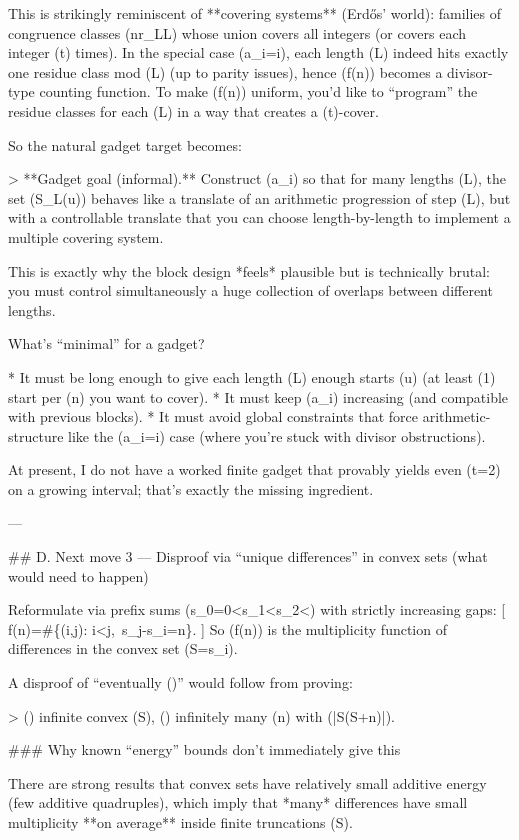 This is strikingly reminiscent of **covering systems** (Erdős’ world): families of congruence classes ({n\equiv r_L\pmod L}) whose union covers all integers (or covers each integer (t) times). In the special case (a_i=i), each length (L) indeed hits exactly one residue class mod (L) (up to parity issues), hence (f(n)) becomes a divisor-type counting function. To make (f(n)) uniform, you’d like to “program” the residue classes for each (L) in a way that creates a (t)-cover.

So the natural gadget target becomes:

> **Gadget goal (informal).** Construct (a_i) so that for many lengths (L), the set ({S_L(u)}) behaves like a translate of an arithmetic progression of step (L), but with a controllable translate that you can choose length-by-length to implement a multiple covering system.

This is exactly why the block design *feels* plausible but is technically brutal: you must control simultaneously a huge collection of overlaps between different lengths.

What’s “minimal” for a gadget?

* It must be long enough to give each length (L) enough starts (u) (at least (1) start per (n) you want to cover).
* It must keep (a_i) increasing (and compatible with previous blocks).
* It must avoid global constraints that force arithmetic-structure like the (a_i=i) case (where you’re stuck with divisor obstructions).

At present, I do not have a worked finite gadget that provably yields even (t=2) on a growing interval; that’s exactly the missing ingredient.

---

## D. Next move 3 — Disproof via “unique differences” in convex sets (what would need to happen)

Reformulate via prefix sums (s_0=0<s_1<s_2<\cdots) with strictly increasing gaps:
[
f(n)=\#\{(i,j): i<j,\ s_j-s_i=n\}.
]
So (f(n)) is the multiplicity function of differences in the convex set (S={s_i}).

A disproof of “eventually ()” would follow from proving:

> (\forall) infinite convex (S), (\exists) infinitely many (n) with (|S\cap(S+n)|).

### Why known “energy” bounds don’t immediately give this

There are strong results that convex sets have relatively small additive energy (few additive quadruples), which imply that *many* differences have small multiplicity **on average** inside finite truncations (S\cap[0,X]).

